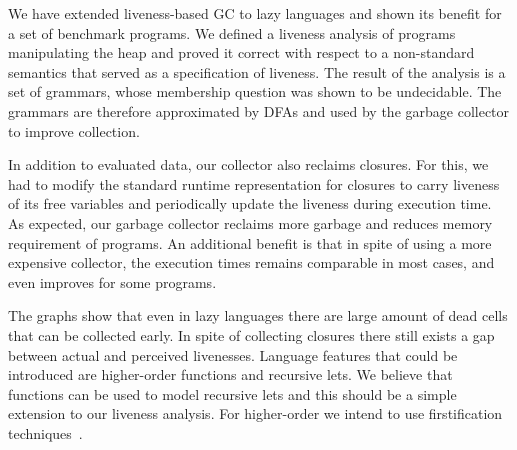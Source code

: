 \documentclass[9pt,nonatbib]{sigplanconf}
\begin{document}

We have  extended liveness-based  GC  to lazy
  languages  and shown  its benefit  for a  set of  benchmark
  programs.  We  defined a liveness analysis  of programs manipulating
  the  heap and  proved  it  correct with  respect  to a  non-standard
  semantics that served as a specification of liveness.  The result of
  the analysis  is a  set of grammars,  whose membership  question was
  shown to be undecidable. The  grammars are therefore approximated by
  DFAs and used by the garbage collector to improve collection.

In addition to  evaluated data, our collector  also reclaims closures.
For this, we  had to modify the standard runtime  representation for
closures  to carry  liveness  of its free  variables and  periodically
update the liveness during execution  time.  As expected, our garbage
collector  reclaims more  garbage and  reduces memory  requirement of
programs.  An  additional benefit is  that in  spite of using  a more
expensive collector, the execution times remains comparable in
most cases, and even improves for some programs.


The graphs show that even in lazy languages there are large amount of
dead cells that can be collected early. In spite of collecting
closures there still exists a gap between actual and perceived
livenesses.  Language features that could be introduced are
higher-order functions and recursive lets. We believe that functions
can be used to model recursive lets and this should be a simple
extension to our liveness analysis.  For higher-order we intend to use
firstification techniques~\cite{Mitchell:2009}.
 
\end{document}
